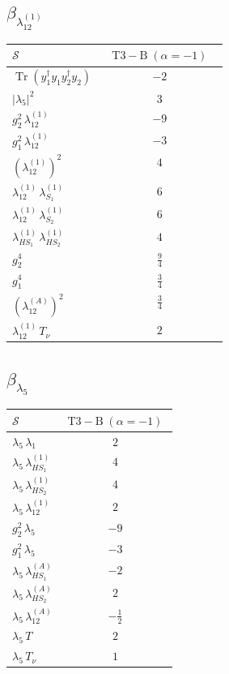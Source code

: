 \documentclass[9pt]{article}
\begin{document}
\subsection*{$ \beta_{\lambda_{12}^{(1)}} $}
\begin{longtable}{@{}p{0.31\linewidth}c@{}}
\toprule
$\mathcal{S}$ & $ \mathrm{T3-B}\;(\alpha=-1) $ \\
\midrule
$ \operatorname{Tr}(y_1^\dagger y_1y_2^\dagger y_2) $ & $ -2 $ \\
$ |\lambda_5|^2 $ & $ 3 $ \\
$ g_2^2\,\lambda_{12}^{(1)} $ & $ -9 $ \\
$ g_1^2\,\lambda_{12}^{(1)} $ & $ -3 $ \\
$ \left(\lambda_{12}^{(1)}\right)^2 $ & $ 4 $ \\
$ \lambda_{12}^{(1)}\,\lambda_{S_1}^{(1)} $ & $ 6 $ \\
$ \lambda_{12}^{(1)}\,\lambda_{S_2}^{(1)} $ & $ 6 $ \\
$ \lambda_{HS_1}^{(1)}\,\lambda_{HS_2}^{(1)} $ & $ 4 $ \\
$ g_2^4 $ & $ \frac{9}{4} $ \\
$ g_1^4 $ & $ \frac{3}{4} $ \\
$ \left(\lambda_{12}^{(A)}\right)^2 $ & $ \frac{3}{4} $ \\
$ \lambda_{12}^{(1)}\,T_\nu $ & $ 2 $ \\
\bottomrule
\end{longtable}
\subsection*{$ \beta_{\lambda_5} $}
\begin{longtable}{@{}p{0.31\linewidth}c@{}}
\toprule
$\mathcal{S}$ & $ \mathrm{T3-B}\;(\alpha=-1) $ \\
\midrule
$ \lambda_5\,\lambda_1 $ & $ 2 $ \\
$ \lambda_5\,\lambda_{HS_1}^{(1)} $ & $ 4 $ \\
$ \lambda_5\,\lambda_{HS_2}^{(1)} $ & $ 4 $ \\
$ \lambda_5\,\lambda_{12}^{(1)} $ & $ 2 $ \\
$ g_2^2\,\lambda_5 $ & $ -9 $ \\
$ g_1^2\,\lambda_5 $ & $ -3 $ \\
$ \lambda_5\,\lambda_{HS_1}^{(A)} $ & $ -2 $ \\
$ \lambda_5\,\lambda_{HS_2}^{(A)} $ & $ 2 $ \\
$ \lambda_5\,\lambda_{12}^{(A)} $ & $ - \frac{1}{2} $ \\
$ \lambda_5\,T $ & $ 2 $ \\
$ \lambda_5\,T_\nu $ & $ 1 $ \\
\bottomrule
\end{longtable}
\end{document}
